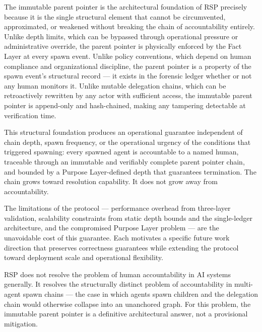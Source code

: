 The immutable parent pointer is the architectural foundation of RSP precisely because it is the single structural element that cannot be circumvented, approximated, or weakened without breaking the chain of accountability entirely. Unlike depth limits, which can be bypassed through operational pressure or administrative override, the parent pointer is physically enforced by the Fact Layer at every spawn event. Unlike policy conventions, which depend on human compliance and organizational discipline, the parent pointer is a property of the spawn event's structural record — it exists in the forensic ledger whether or not any human monitors it. Unlike mutable delegation chains, which can be retroactively rewritten by any actor with sufficient access, the immutable parent pointer is append-only and hash-chained, making any tampering detectable at verification time.

This structural foundation produces an operational guarantee independent of chain depth, spawn frequency, or the operational urgency of the conditions that triggered spawning: every spawned agent is accountable to a named human, traceable through an immutable and verifiably complete parent pointer chain, and bounded by a Purpose Layer-defined depth that guarantees termination. The chain grows toward resolution capability. It does not grow away from accountability.

The limitations of the protocol — performance overhead from three-layer validation, scalability constraints from static depth bounds and the single-ledger architecture, and the compromised Purpose Layer problem — are the unavoidable cost of this guarantee. Each motivates a specific future work direction that preserves correctness guarantees while extending the protocol toward deployment scale and operational flexibility.

RSP does not resolve the problem of human accountability in AI systems generally. It resolves the structurally distinct problem of accountability in multi-agent spawn chains — the case in which agents spawn children and the delegation chain would otherwise collapse into an unanchored graph. For this problem, the immutable parent pointer is a definitive architectural answer, not a provisional mitigation.